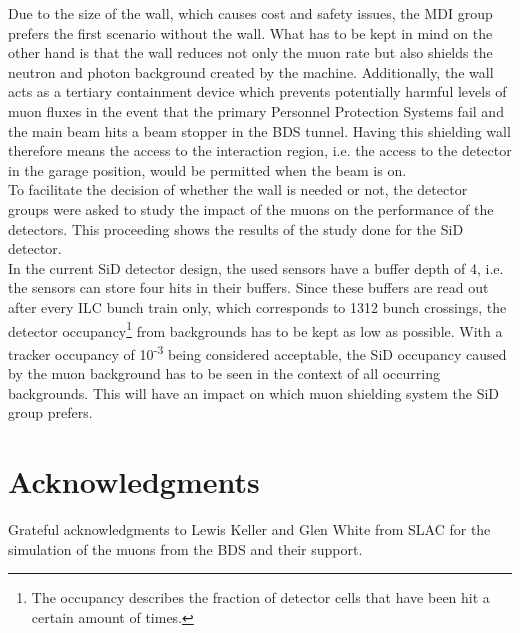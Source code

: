 \documentclass[12pt]{article}
\begin{document}
Due to the size of the wall, which causes cost and safety issues, the MDI group prefers the first scenario without the wall.
What has to be kept in mind on the other hand is that the wall reduces not only the muon rate but also shields the neutron and photon background created by the machine.
Additionally, the wall acts as a tertiary containment device which prevents potentially harmful levels of muon fluxes in the event that the primary Personnel Protection Systems fail and the main beam hits a beam stopper in the BDS tunnel.
Having this shielding wall therefore means the access to the interaction region, i.e. the access to the detector in the garage position, would be permitted when the beam is on.
\\
To facilitate the decision of whether the wall is needed or not, the detector groups were asked to study the impact of the muons on the performance of the detectors.
This proceeding shows the results of the study done for the SiD detector.\\
In the current SiD detector design, the used sensors have a buffer depth of 4, i.e. the sensors can store four hits in their buffers.
Since these buffers are read out after every ILC bunch train only, which corresponds to 1312 bunch crossings, the detector occupancy\footnote{The occupancy describes the fraction of detector cells that have been hit a certain amount of times.} from backgrounds has to be kept as low as possible.
With a tracker occupancy of 10\textsuperscript{-3} being considered acceptable, the SiD occupancy caused by the muon background has to be seen in the context of all occurring backgrounds.
This will have an impact on which muon shielding system the SiD group prefers.







\section*{Acknowledgments}
Grateful acknowledgments to Lewis Keller and Glen White from SLAC for the simulation of the muons from the BDS and their support.

%




\end{document}
